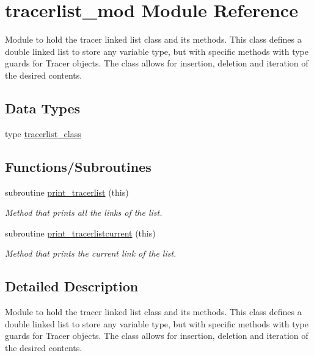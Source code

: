 \hypertarget{namespacetracerlist__mod}{}\section{tracerlist\+\_\+mod Module Reference}
\label{namespacetracerlist__mod}


Module to hold the tracer linked list class and its methods. This class defines a double linked list to store any variable type, but with specific methods with type guards for Tracer objects. The class allows for insertion, deletion and iteration of the desired contents.  


\subsection*{Data Types}
\begin{DoxyCompactItemize}
\item 
type \mbox{\hyperlink{structtracerlist__mod_1_1tracerlist__class}{tracerlist\+\_\+class}}
\end{DoxyCompactItemize}
\subsection*{Functions/\+Subroutines}
\begin{DoxyCompactItemize}
\item 
subroutine \mbox{\hyperlink{namespacetracerlist__mod_ae45210a1a3aa4111f97deb5ecf811ca5}{print\+\_\+tracerlist}} (this)
\begin{DoxyCompactList}\small\item\em Method that prints all the links of the list. \end{DoxyCompactList}\item 
subroutine \mbox{\hyperlink{namespacetracerlist__mod_a4476a16f089c0b6e249e7136f73b510c}{print\+\_\+tracerlistcurrent}} (this)
\begin{DoxyCompactList}\small\item\em Method that prints the current link of the list. \end{DoxyCompactList}\end{DoxyCompactItemize}


\subsection{Detailed Description}
Module to hold the tracer linked list class and its methods. This class defines a double linked list to store any variable type, but with specific methods with type guards for Tracer objects. The class allows for insertion, deletion and iteration of the desired contents. 


